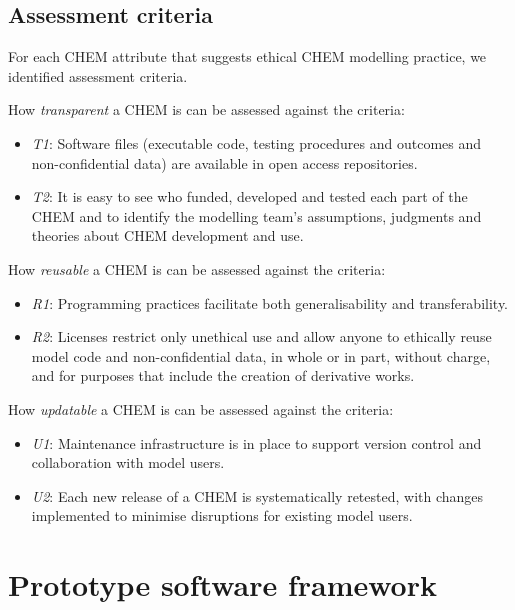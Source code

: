 \documentclass[sn-vancouver,Numbered,pdflatex]{sn-jnl}
\theoremstyle{remark}
\theoremstyle{definition}
\begin{document}
\hypertarget{assessment-criteria}{%
\subsection{Assessment criteria}\label{assessment-criteria}}

For each CHEM attribute that suggests ethical CHEM modelling practice, we identified assessment criteria.

How \emph{transparent} a CHEM is can be assessed against the criteria:

\begin{itemize}
\item
  \emph{T1}: Software files (executable code, testing procedures and outcomes and non-confidential data) are available in open access repositories.
\item
  \emph{T2}: It is easy to see who funded, developed and tested each part of the CHEM and to identify the modelling team's assumptions, judgments and theories about CHEM development and use.
\end{itemize}

How \emph{reusable} a CHEM is can be assessed against the criteria:

\begin{itemize}
\item
  \emph{R1}: Programming practices facilitate both generalisability and transferability.
\item
  \emph{R2}: Licenses restrict only unethical use and allow anyone to ethically reuse model code and non-confidential data, in whole or in part, without charge, and for purposes that include the creation of derivative works.
\end{itemize}

How \emph{updatable} a CHEM is can be assessed against the criteria:

\begin{itemize}
\item
  \emph{U1}: Maintenance infrastructure is in place to support version control and collaboration with model users.
\item
  \emph{U2}: Each new release of a CHEM is systematically retested, with changes implemented to minimise disruptions for existing model users.
\end{itemize}

\hypertarget{prototype-software-framework}{%
\section{Prototype software framework}\label{prototype-software-framework}}
\end{document}
